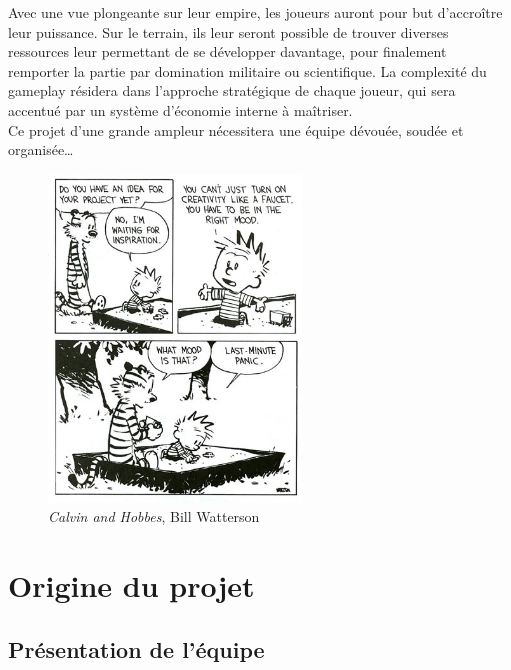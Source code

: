 \documentclass[12pt]{report}
\begin{document}
Avec une vue plongeante sur leur empire, les joueurs auront pour but d’accroître leur puissance. Sur le terrain, ils leur seront possible de trouver diverses ressources leur permettant de se développer davantage, pour finalement remporter la partie par domination militaire ou scientifique. La complexité du gameplay résidera dans l’approche stratégique de chaque joueur, qui sera accentué par un système d’économie interne à maîtriser.\\

Ce projet d’une grande ampleur nécessitera une équipe dévouée, soudée et organisée\ldots

\begin{figure}
    \centering
    \includegraphics[width=0.6\textwidth]{project_mood}
    \caption*{\textit{Calvin and Hobbes}, Bill Watterson}
\end{figure}

\chapter{Origine du projet}

\section{Présentation de l'équipe}
\end{document}
